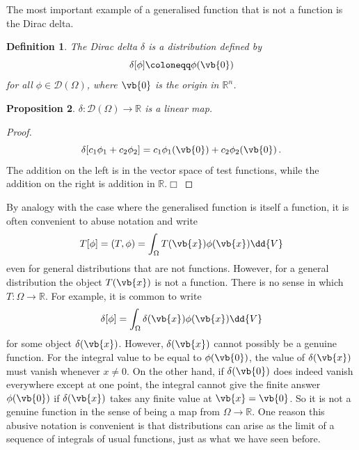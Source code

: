 \documentclass{article}
\theoremstyle{plain}\theoremheaderfont{\normalfont\itshape}\theorembodyfont{\rmfamily}\theoremseparator{.}\newtheorem*{rem}{Remark}\newtheorem*{ex}{Example}\newtheorem*{proof}{Proof}\newtheorem*{altp}{Alternative proof}
\theoremstyle{plain}\theoremheaderfont{\normalfont\bfseries}\theorembodyfont{\rmfamily}\theoremseparator{.}\newtheorem{thm}{Theorem}[section]\newtheorem{lem}[thm]{Lemma}\newtheorem{prop}[thm]{Proposition}\newtheorem*{cor}{Corollary}\newtheorem{defn}[thm]{Definition}\newtheorem{clm}[thm]{Claim}\newtheorem{clminproof}{Claim}
\theoremstyle{break}\theoremheaderfont{\normalfont\itshape}\theorembodyfont{\rmfamily}\theoremseparator{.\medskip}\newtheorem*{proofskip}{Proof}\newtheorem*{exs}{Examples}\newtheorem*{rems}{Remarks}
\theoremstyle{break}\theoremheaderfont{\normalfont\bfseries}\theorembodyfont{\rmfamily}\theoremseparator{.\medskip}\newtheorem{lemskip}[thm]{Lemma}\newtheorem{defnskip}[thm]{Definition}\newtheorem{propskip}[thm]{Proposition}\newtheorem{thmskip}[thm]{Theorem}
\numberwithin{equation}{section}
\newcommand{\qed}{\hfill\ensuremath{\Box}}
\begin{document}
	The most important example of a generalised function that is not a function is the Dirac delta.
	\begin{defn}
		The \textit{Dirac delta} \(\delta\) is a distribution defined by
		\[\delta[\phi]\coloneqq\phi(\vb{0})\]
		for all \(\phi\in\mathcal{D}(\Omega)\), where \(\vb{0}\) is the origin in \(\mathbb{R}^n\).
	\end{defn}
	\begin{prop}
		\(\delta:\mathcal{D}(\Omega)\to\mathbb{R}\) is a linear map.
	\end{prop}
	\begin{proof}
		\[\delta[c_1\phi_1+c_2\phi_2]=c_1\phi_1(\vb{0})+c_2\phi_2(\vb{0})\,.\]
		The addition on the left is in the vector space of test functions, while the addition on the right is addition in \(\mathbb{R}\).\qed
	\end{proof}
	By analogy with the case where the generalised function is itself a function, it is often convenient to abuse notation and write
	\[T[\phi]=(T,\phi)=\int_\Omega T(\vb{x})\phi(\vb{x})\dd{V}\]
	even for general distributions that are not functions. However, for a general distribution the object \(T(\vb{x})\) is not a function. There is no sense in which \(T:\Omega\to\mathbb{R}\). For example, it is common to write
	\[\delta[\phi]=\int_\Omega\delta(\vb{x})\phi(\vb{x})\dd{V}\]
	for some object \(\delta(\vb{x})\). However, \(\delta(\vb{x})\) cannot possibly be a genuine function. For the integral value to be equal to \(\phi(\vb{0})\), the value of \(\delta(\vb{x})\) must vanish whenever \(x\ne 0\). On the other hand, if \(\delta(\vb{0})\) does indeed vanish everywhere except at one point, the integral cannot give the finite answer \(\phi(\vb{0})\) if \(\delta(\vb{x})\) takes any finite value at \(\vb{x}=\vb{0}\). So it is not a genuine function in the sense of being a map from \(\Omega\to\mathbb{R}\). One reason this abusive notation is convenient is that distributions can arise as the limit of a sequence of integrals of usual functions, just as what we have seen before.
\end{document}
